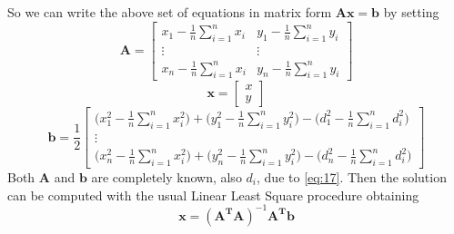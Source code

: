 \documentclass[12pt]{report}
\begin{document}
So we can write the above set of equations in matrix form $\mathbf{Ax}=\mathbf{b}$ by setting
$$
\mathbf{A}=\begin{bmatrix}
    x_1-\frac{1}{n}\sum_{i=1}^nx_i&y_1-\frac{1}{n}\sum_{i=1}^ny_i\\
    \vdots&\vdots\\
    x_n-\frac{1}{n}\sum_{i=1}^nx_i&y_n-\frac{1}{n}\sum_{i=1}^ny_i
\end{bmatrix}
$$
$$
\mathbf{x}=\begin{bmatrix}
    x\\
    y
\end{bmatrix}
$$
$$\mathbf{b}=\frac{1}{2}
\begin{bmatrix}
\bigg(x_1^2-\frac{1}{n}\sum_{i=1}^nx^2_i\bigg)+\bigg(y_1^2-\frac{1}{n}\sum_{i=1}^ny^2_i\bigg)-\bigg(d_1^2-\frac{1}{n}\sum_{i=1}^nd_i^2\bigg)\\
\vdots\\
\bigg(x_n^2-\frac{1}{n}\sum_{i=1}^nx^2_i\bigg)+\bigg(y_n^2-\frac{1}{n}\sum_{i=1}^ny^2_i\bigg)-\bigg(d_n^2-\frac{1}{n}\sum_{i=1}^nd_i^2\bigg)
\end{bmatrix}
$$
Both $\mathbf{A}$ and $\mathbf{b}$ are completely known, also $d_i$, due to \eqref{eq:17}. Then the solution can be computed with the usual Linear Least Square procedure obtaining
\begin{equation}
    \mathbf{x}=(\mathbf{A^TA})^{-1}\mathbf{A^Tb}
\end{equation}
\clearpage
\end{document}

